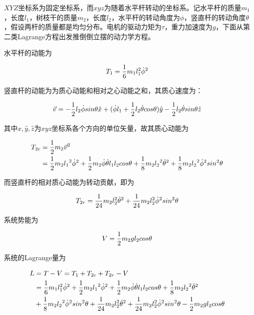 \documentclass[UTF8]{ctexart}
\begin{document}
$XYZ$坐标系为固定坐标系，而$xyz$为随着水平杆转动的坐标系。记水平杆的质量$m_1$，长度$l_1$，树枝干的质量$m_2$，长度$l_2$，水平杆的转动角度为$\phi$，竖直杆的转动角度$\theta$，假设两杆的质量都是均匀分布。电机的驱动力矩为$\tau$，重力加速度为$g$，下面从第二类Lagrange方程出发推倒倒立摆的动力学方程。

水平杆的动能为

\begin{equation}
    T_1 = \frac{1}{6} m_1 l_1^2 {\dot{\phi}}^2
\end{equation}

竖直杆的动能为为质心动能和相对之心动能之和，其质心速度为：

\begin{equation}
    \vec v = -\frac{1}{2} l_2 \dot{\phi} sin \theta \hat x
    +(\dot{\phi} l_1+\frac{1}{2} l_2 \dot{\theta} cos \theta )\hat y
    - \frac{1}{2} l_2 \dot{\theta} sin \theta \hat z 
\end{equation}

其中$\hat{x},\hat{y},\hat{z}$为$xyz$坐标系各个方向的单位矢量，故其质心动能为

\begin{equation}
    \begin{aligned}
    T_{2c} &= \frac{1}{2} m_2 \vec v^2\\ 
    &= \frac{1}{2} m_2 {l_1}^2 {\dot{\phi}}^2
    +\frac{1}{2} m_2 \dot{\phi} \dot{\theta} l_1 l_2 cos \theta
    +\frac{1}{8} m_2 {l_2}^2 {\dot{\theta}}^2
    +\frac{1}{8} m_2 {l_2}^2 {\dot{\phi}}^2 sin^2 \theta
    \end{aligned}
\end{equation}

而竖直杆的相对质心动能为转动贡献，即为

\begin{equation}
    T_{2r} = \frac{1}{24} m_2 l_2^2 {\dot{\theta}}^2+ \frac{1}{24} m_2 l_2^2 {\dot{\phi}}^2 sin^2 \theta
\end{equation}

系统势能为

\begin{equation}
    V = \frac{1}{2} m_2 g l_2 cos \theta
\end{equation}

系统的Lagrange量为

\begin{equation}
    \begin{aligned}
        L &= T - V = T_1 + T_{2c} + T_{2r} - V\\
        &= \frac{1}{6} m_1 l_1^2 {\dot{\phi}}^2
        +\frac{1}{2} m_2 {l_1}^2 {\dot{\phi}}^2
        +\frac{1}{2} m_2 \dot{\phi} \dot{\theta} l_1 l_2 cos \theta
        +\frac{1}{8} m_2 {l_2}^2 {\dot{\theta}}^2\\
        &+\frac{1}{8} m_2 {l_2}^2 {\dot{\phi}}^2 sin^2 \theta
        +\frac{1}{24} m_2 l_2^2 {\dot{\theta}}^2
        + \frac{1}{24} m_2 l_2^2 {\dot{\phi}}^2 sin^2 \theta
        -\frac{1}{2} m_2 g l_2 cos \theta
    \end{aligned}
\end{equation}
\end{document}
